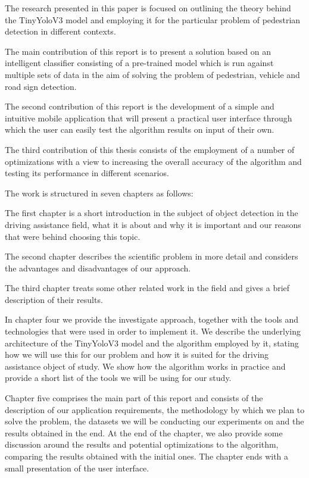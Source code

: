 \documentclass[runningheads,a4paper,11pt]{report}
\begin{document}
The research presented in this paper is focused on outlining the theory behind the TinyYoloV3 model and employing it for the particular problem of pedestrian detection in different contexts.

The main contribution of this report is to present a solution based on an intelligent classifier consisting of a pre-trained model which is run against multiple sets of data in the aim of solving the problem of pedestrian, vehicle and road sign detection.

The second contribution of this report is the development of a simple and intuitive mobile application that will present a practical user interface through which the user can easily test the algorithm results on input of their own.

The third contribution of this thesis consists of the employment of a number of optimizations with a view to increasing the overall accuracy of the algorithm and testing its performance in different scenarios.

The work is structured in seven chapters as follows: 

The first chapter is a short introduction in the subject of object detection in the driving assistance field, what it is about and why it is important and our reasons that were behind choosing this topic. 

The second chapter describes the scientific problem in more detail and considers the advantages and disadvantages of our approach.

The third chapter treats some other related work in the field and gives a brief description of their results.

In chapter four we provide the investigate approach, together with the tools and technologies that were used in order to implement it. We describe the underlying architecture of the TinyYoloV3 model and the algorithm employed by it, stating how we will use this for our problem and how it is suited for the driving assistance object of study. We show how the algorithm works in practice and provide a short list of the tools we will be using for our study.

Chapter five comprises the main part of this report and consists of the description of our application requirements, the methodology by which we plan to solve the problem, the datasets we will be conducting our experiments on and the results obtained in the end. At the end of the chapter, we also provide some discussion around the results and potential optimizations to the algorithm, comparing the results obtained with the initial ones. The chapter ends with a small presentation of the user interface.
\end{document}
